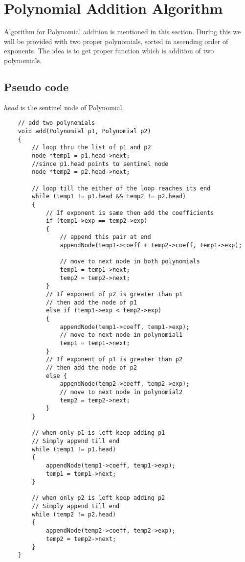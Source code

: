\section{Polynomial Addition Algorithm}
Algorithm for Polynomial addition is mentioned in this section. During this we will be provided with two proper polynomials, sorted in ascending order of exponents. The idea is to get proper function which is addition of two polynomials.

\subsection{Pseudo code}
$head$ is the sentinel node of Polynomial.
\begin{lstlisting}
    // add two polynomials
    void add(Polynomial p1, Polynomial p2) 
    {
        // loop thru the list of p1 and p2
        node *temp1 = p1.head->next; 
        //since p1.head points to sentinel node
        node *temp2 = p2.head->next;
        
        // loop till the either of the loop reaches its end
        while (temp1 != p1.head && temp2 != p2.head) 
        {
            // If exponent is same then add the coefficients
            if (temp1->exp == temp2->exp)
            {
                // append this pair at end
                appendNode(temp1->coeff + temp2->coeff, temp1->exp);
                
                // move to next node in both polynomials
                temp1 = temp1->next;
                temp2 = temp2->next;
            }
            // If exponent of p2 is greater than p1 
            // then add the node of p1
            else if (temp1->exp < temp2->exp) 
            {
                appendNode(temp1->coeff, temp1->exp);
                // move to next node in polynomial1
                temp1 = temp1->next;
            }
            // If exponent of p1 is greater than p2 
            // then add the node of p2
            else {
                appendNode(temp2->coeff, temp2->exp);
                // move to next node in polynomial2
                temp2 = temp2->next;
            }
        }
        
        // when only p1 is left keep adding p1
        // Simply append till end
        while (temp1 != p1.head)
        {
            appendNode(temp1->coeff, temp1->exp);
            temp1 = temp1->next;
        }
        
        // when only p2 is left keep adding p2
        // Simply append till end
        while (temp2 != p2.head)
        {
            appendNode(temp2->coeff, temp2->exp);
            temp2 = temp2->next;
        }
    }
\end{lstlisting}

